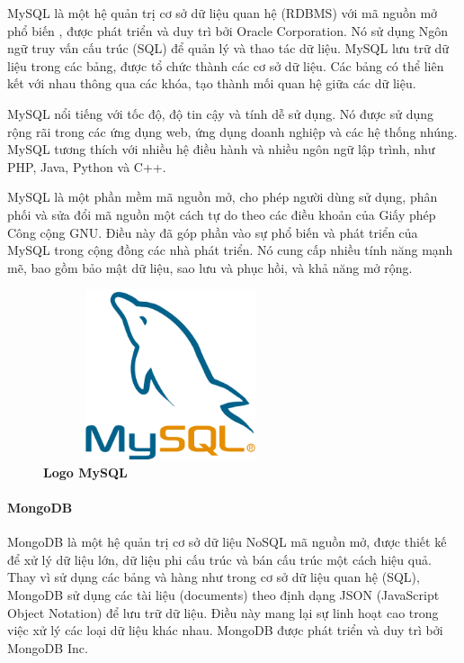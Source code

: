 MySQL là một hệ quản trị cơ sở dữ liệu quan hệ (RDBMS) với mã nguồn mở phổ biến \cite{mysql}, được phát triển và duy trì bởi Oracle Corporation. Nó sử dụng Ngôn ngữ truy vấn cấu trúc (SQL) để quản lý và thao tác dữ liệu. MySQL lưu trữ dữ liệu trong các bảng, được tổ chức thành các cơ sở dữ liệu. Các bảng có thể liên kết với nhau thông qua các khóa, tạo thành mối quan hệ giữa các dữ liệu.

MySQL nổi tiếng với tốc độ, độ tin cậy và tính dễ sử dụng. Nó được sử dụng rộng rãi trong các ứng dụng web, ứng dụng doanh nghiệp và các hệ thống nhúng. MySQL tương thích với nhiều hệ điều hành và nhiều ngôn ngữ lập trình, như PHP, Java, Python và C++.

MySQL là một phần mềm mã nguồn mở, cho phép người dùng sử dụng, phân phối và sửa đổi mã nguồn một cách tự do theo các điều khoản của Giấy phép Công cộng GNU. Điều này đã góp phần vào sự phổ biến và phát triển của MySQL trong cộng đồng các nhà phát triển. Nó cung cấp nhiều tính năng mạnh mẽ, bao gồm bảo mật dữ liệu, sao lưu và phục hồi, và khả năng mở rộng.

\begin{figure}[H]
	\centering
	\includegraphics[width=7.5cm,height=5cm]{Images/Technology/mysql.png}
	\caption[Logo MySQL]{\bfseries \fontsize{12pt}{0pt}
		\selectfont Logo MySQL}
	\label{mysql} %
\end{figure}

\paragraph{MongoDB}
\mbox{}

MongoDB là một hệ quản trị cơ sở dữ liệu NoSQL mã nguồn mở, được thiết kế để xử lý dữ liệu lớn, dữ liệu phi cấu trúc và bán cấu trúc một cách hiệu quả. Thay vì sử dụng các bảng và hàng như trong cơ sở dữ liệu quan hệ (SQL), MongoDB sử dụng các tài liệu (documents) theo định dạng JSON (JavaScript Object Notation) để lưu trữ dữ liệu. Điều này mang lại sự linh hoạt cao trong việc xử lý các loại dữ liệu khác nhau. MongoDB được phát triển và duy trì bởi MongoDB Inc.

